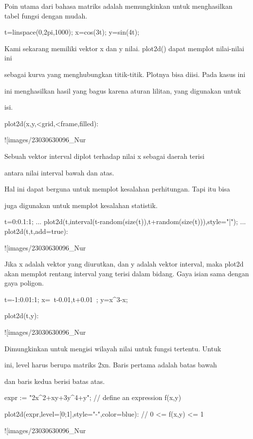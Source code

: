 \documentclass{article}
\begin{document}
Poin utama dari bahasa matriks adalah memungkinkan untuk menghasilkan
tabel fungsi dengan mudah.


\>t=linspace(0,2pi,1000); x=cos(3\*t); y=sin(4\*t);


Kami sekarang memiliki vektor x dan y nilai. plot2d() dapat memplot
nilai-nilai ini


sebagai kurva yang menghubungkan titik-titik. Plotnya bisa diisi. Pada
kasus ini


ini menghasilkan hasil yang bagus karena aturan lilitan, yang
digunakan untuk


isi.


\>plot2d(x,y,<grid,<frame,\>filled):


![images/23030630096_Nur%

Sebuah vektor interval diplot terhadap nilai x sebagai daerah terisi


antara nilai interval bawah dan atas.


Hal ini dapat berguna untuk memplot kesalahan perhitungan. Tapi itu
bisa


juga digunakan untuk memplot kesalahan statistik.


\>t=0:0.1:1; ...  
\>    plot2d(t,interval(t-random(size(t)),t+random(size(t))),style="|");  ...  
\>    plot2d(t,t,add=true):


![images/23030630096_Nur%

Jika x adalah vektor yang diurutkan, dan y adalah vektor interval,
maka plot2d akan memplot rentang interval yang terisi dalam bidang.
Gaya isian sama dengan gaya poligon.


\>t=-1:0.01:1; x=~t-0.01,t+0.01~; y=x^3-x;

\>plot2d(t,y):


![images/23030630096_Nur%

Dimungkinkan untuk mengisi wilayah nilai untuk fungsi tertentu. Untuk


ini, level harus berupa matriks 2xn. Baris pertama adalah batas bawah


dan baris kedua berisi batas atas.


\>expr := "2\*x^2+x\*y+3\*y^4+y"; // define an expression f(x,y)

\>plot2d(expr,level=[0;1],style="-",color=blue): // 0 <= f(x,y) <= 1


![images/23030630096_Nur%
\end{document}
